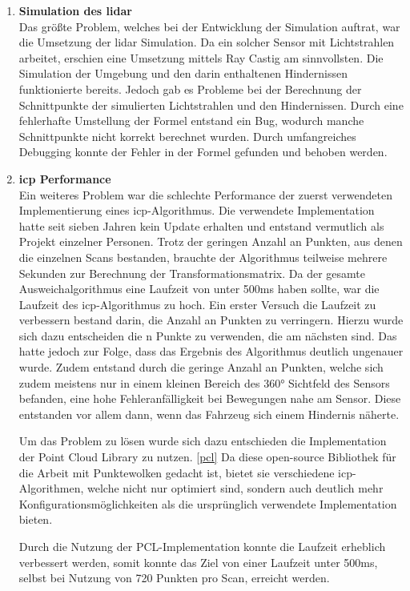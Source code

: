 \begin{enumerate}[leftmargin=*]
    \item \textbf{Simulation des \ac{lidar}} \\
    Das größte Problem, welches bei der Entwicklung der Simulation auftrat, war die Umsetzung der \ac{lidar} Simulation.
    Da ein solcher Sensor mit Lichtstrahlen arbeitet, erschien eine Umsetzung mittels Ray Castig am sinnvollsten.
    Die Simulation der Umgebung und den darin enthaltenen Hindernissen funktionierte bereits.
    Jedoch gab es Probleme bei der Berechnung der Schnittpunkte der simulierten Lichtstrahlen und den Hindernissen.
    Durch eine fehlerhafte Umstellung der Formel entstand ein Bug, wodurch manche Schnittpunkte nicht korrekt berechnet wurden.
    Durch umfangreiches Debugging konnte der Fehler in der Formel gefunden und behoben werden.

    \item \textbf{\ac{icp} Performance} \\
    Ein weiteres Problem war die schlechte Performance der zuerst verwendeten Implementierung eines \acf{icp}-Algorithmus.
    Die verwendete Implementation hatte seit sieben Jahren kein Update erhalten und entstand vermutlich als Projekt einzelner Personen.
    Trotz der geringen Anzahl an Punkten, aus denen die einzelnen Scans bestanden, brauchte der Algorithmus teilweise mehrere Sekunden zur Berechnung der Transformationsmatrix.
    Da der gesamte Ausweichalgorithmus eine Laufzeit von unter 500ms haben sollte, war die Laufzeit des \ac{icp}-Algorithmus zu hoch.
    Ein erster Versuch die Laufzeit zu verbessern bestand darin, die Anzahl an Punkten zu verringern.
    Hierzu wurde sich dazu entscheiden die n Punkte zu verwenden, die am nächsten sind.
    Das hatte jedoch zur Folge, dass das Ergebnis des Algorithmus deutlich ungenauer wurde.
    Zudem entstand durch die geringe Anzahl an Punkten, welche sich zudem meistens nur in einem kleinen Bereich des 360° Sichtfeld des Sensors befanden, 
    eine hohe Fehleranfälligkeit bei Bewegungen nahe am Sensor.
    Diese entstanden vor allem dann, wenn das Fahrzeug sich einem Hindernis näherte.

    Um das Problem zu lösen wurde sich dazu entschieden die Implementation der Point Cloud Library zu nutzen. \ref{pcl}
    Da diese open-source Bibliothek für die Arbeit mit Punktewolken gedacht ist, bietet sie verschiedene \ac{icp}-Algorithmen,
    welche nicht nur optimiert sind, sondern auch deutlich mehr Konfigurationsmöglichkeiten als die ursprünglich verwendete Implementation bieten.
    
    Durch die Nutzung der PCL-Implementation konnte die Laufzeit erheblich verbessert werden,
    somit konnte das Ziel von einer Laufzeit unter 500ms, selbst bei Nutzung von 720 Punkten pro Scan, erreicht werden.


\end{enumerate}
